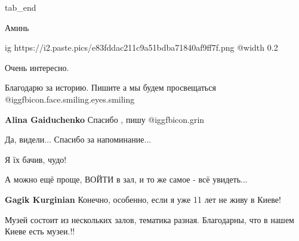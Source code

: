 \begin{itemize}
  tab_end
\fi

Аминь


\ifcmt
  ig https://i2.paste.pics/e83fddac211c9a51bdba71840af9ff7f.png
  @width 0.2
\fi

Очень интересно.

Благодарю за историю. Пишите а мы будем просвещаться @igg{fbicon.face.smiling.eyes.smiling} 

\textbf{Alina Gaiduchenko} Спасибо , пишу @igg{fbicon.grin} 

Да, видели... Спасибо за напоминание...

Я їх бачив, чудо!

А можно ещё проще, ВОЙТИ в зал, и то же самое - всё увидеть...

\textbf{Gagik Kurginian} Конечно, особенно, если я уже 11 лет не живу в Киеве!

Музей состоит из нескольких залов, тематика разная. Благодарны, что в нашем Киеве есть музеи.!!


\end{itemize} %
